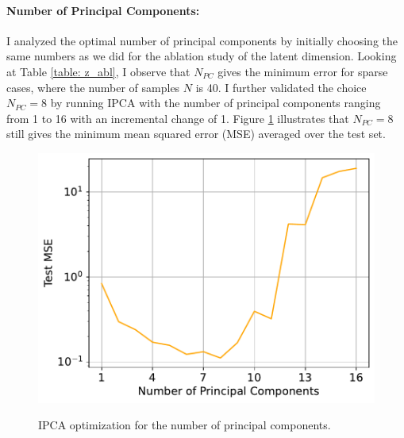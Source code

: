 \paragraph{Number of Principal Components:}
I analyzed the optimal number of principal components by initially choosing the same numbers as we did for the ablation study of the latent dimension. Looking at Table \ref{table: z_abl}, I observe that $N_{PC}$ gives the minimum error for sparse cases, where the number of samples $N$ is 40. I further validated the choice $N_{PC} = 8$ by running IPCA with the number of principal components ranging from 1 to 16 with an incremental change of 1. Figure \ref{fig:ipca_opt} illustrates that $N_{PC} = 8$ still gives the minimum mean squared error (MSE) averaged over the test set.


\begin{figure}[ht]
  \centering

  {\includegraphics[width=0.6\linewidth]{Chapters/hyperbrdf-figs/ipca_opt_q_40_cropped.pdf}}
   \caption{IPCA optimization for the number of principal components.}
   \label{fig:ipca_opt}
\end{figure}

\begin{table}[ht]
    \centering
    \caption{Average mean squared errors for varying latent space dimensions (first row) and number of principal components (second row).}

    \label{table: z_abl}
\end{table}


